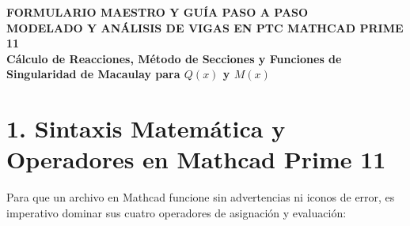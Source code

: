 \documentclass[10pt,a4paper]{article}
\begin{document}
\begin{tcolorbox}[enhanced,colback=NavyBlue,colframe=NavyBlue,sharp corners,boxrule=0pt,center,halign=center]
    \vspace{4pt}
    {\Huge \textbf{\color{white}\sffamily FORMULARIO MAESTRO Y GUÍA PASO A PASO}}\\[4pt]
    {\Large \textbf{\color{WarmGold}\sffamily MODELADO Y ANÁLISIS DE VIGAS EN PTC MATHCAD PRIME 11}}\\[6pt]
    {\normalsize \color{white} \textbf{Cálculo de Reacciones, Método de Secciones y Funciones de Singularidad de Macaulay para $Q(x)$ y $M(x)$}}
    \vspace{4pt}
\end{tcolorbox}

\vspace{10pt}

\begin{abstract}
\noindent Esta guía constituye el manual formal y formulario definitivo para resolver \textbf{cualquier problema de vigas isostáticas} en el software \textbf{PTC Mathcad Prime 11}. Explica minuciosamente cómo se dividen los tramos, cómo declarar los datos de entrada sin colisiones, cómo formular las ecuaciones de equilibrio con operadores simbólicos (\texttt{solve}), el fundamento matemático de las condiciones booleanas de Macaulay, por qué se anulan los brazos de palanca en la fuerza cortante y la razón técnica del rango continuo infinitesimal ($1\,\text{mm}$). Incluye además la resolución completa y paso a paso del ejercicio de examen de referencia.
\end{abstract}

\vspace{8pt}

\section{\color{NavyBlue}1. Sintaxis Matemática y Operadores en Mathcad Prime 11}

Para que un archivo en Mathcad funcione sin advertencias ni iconos de error, es imperativo dominar sus cuatro operadores de asignación y evaluación:
\end{document}
